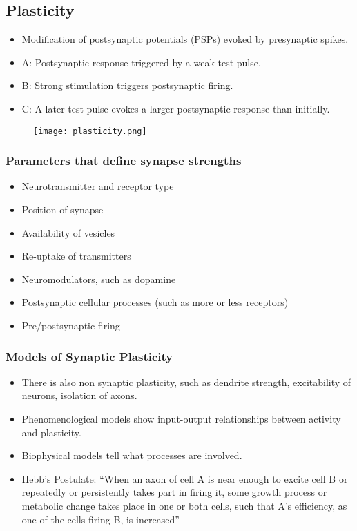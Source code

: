 \documentclass[main]{subfiles}
\begin{document}
\subsection{Plasticity}
\begin{itemize}[noitemsep,nolistsep]
	\item Modification of postsynaptic potentials (PSPs) evoked by presynaptic spikes.
	\item A: Postsynaptic response triggered by a weak test pulse.
	\item B: Strong stimulation triggers postsynaptic firing.
	\item C: A later test pulse evokes a larger postsynaptic response than initially.
\end{itemize}

\begin{figure}[H]
	\centering
	\texttt{[image: plasticity.png]}
\end{figure}

\subsubsection{Parameters that define synapse strengths}
\begin{itemize}[noitemsep,nolistsep]
	\item Neurotransmitter and receptor type
	\item Position of synapse
	\item Availability of vesicles
	\item Re-uptake of transmitters
	\item Neuromodulators, such as dopamine
	\item Postsynaptic cellular processes (such as more or less receptors)
	\item Pre/postsynaptic firing
\end{itemize}

\subsubsection{Models of Synaptic Plasticity}
\begin{itemize}[noitemsep,nolistsep]
	\item There is also non synaptic plasticity, such as dendrite strength, excitability of neurons, isolation of axons.
	\item Phenomenological models show input-output relationships between activity and plasticity.
	\item Biophysical models tell what processes are involved.
	\item Hebb's Postulate: ``When an axon of cell A is near enough to excite cell B or repeatedly or persistently takes part in firing it, some growth process or metabolic change takes place in one or both cells, such that A's efficiency, as one of the cells firing B, is increased''
\end{itemize}
\end{document}
